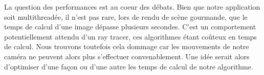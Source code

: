 \documentclass [11pt]{article}
\begin{document}
	La question des performances est au coeur des débats. Bien que notre application soit multithreadée, il n'est pas rare, lors de rendu de scène gourmande, que le
	temps de calcul d'une image dépasse plusieurs secondes. C'est un comportement potentiellement attendu d'un ray tracer, ces algorithmes étant coûteux en temps de calcul.
	Nous trouvons toutefois cela dommage car les mouvements de notre caméra ne peuvent alors plus s'effectuer convenablement. Une idée serait alors d'optimiser d'une façon
	ou d'une autre les temps de calcul de notre algorithme.
\end{document}
